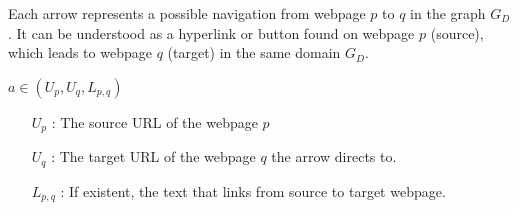 Each arrow represents a possible navigation from webpage $p$ to $q$ in the graph $G_D$. It can be understood as a hyperlink or button found on webpage $p$ (source), which leads to webpage $q$ (target) in the same domain $G_D$. 

\begin{center}
	$a \in (U_p, U_q, L_{p,q})$
	\begin{itemize}
		\item[$U_p$] : The source URL of the webpage $p$
		\item[$U_q$] : The target URL of the webpage $q$ the arrow directs to.
		\item[$L_{p,q}$] : If existent, the text that links from source to target webpage. 
	\end{itemize}
\end{center}

